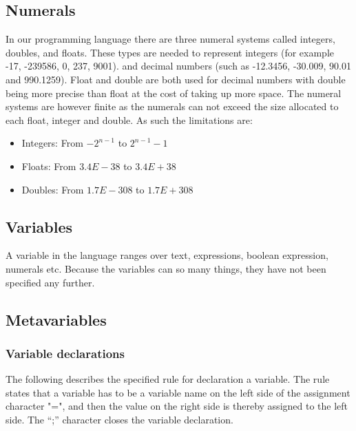 \subsection{Numerals}
In our programming language there are three numeral systems called integers, doubles, and floats. These types are needed to represent integers (for example -17, -239586, 0, 237, 9001). and decimal numbers (such as -12.3456, -30.009, 90.01 and 990.1259). Float and double are both used for decimal numbers with double being more precise than float at the cost of taking up more space. The numeral systems are however finite as the numerals can not exceed the size allocated to each float, integer and double. As such the limitations are:
\begin{itemize}
\item Integers: From $-2^{n-1}$ to $2^{n-1}-1$
\item Floats: From $3.4E-38$ to $3.4E+38$
\item Doubles: From $1.7E-308$ to $1.7E+308$
\end{itemize}

\subsection{Variables}
A variable in the language ranges over text, expressions, boolean expression, numerals etc. Because the variables can so many things, they have not been specified any further. 

\subsection{Metavariables}

\subsubsection{Variable declarations}\label{sec:analysis:syntax-definition:variable-declaration}
The following describes the specified rule for declaration a variable. The rule states that a variable has to be a variable name on the left side of the assignment character "=", and then the value on the right side is thereby assigned to the left side. The ``;'' character closes the variable declaration.

